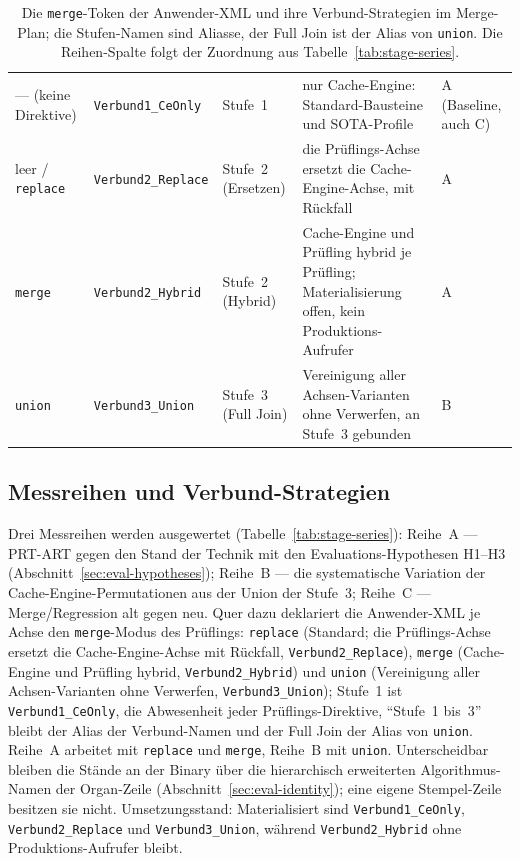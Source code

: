 \begin{nurlang}
\begin{table}[htbp]
\begin{tabular}{@{}ll>{\raggedright\arraybackslash}p{2.2cm}>{\raggedright\arraybackslash}p{4.4cm}>{\raggedright\arraybackslash}p{1.6cm}@{}}
\midrule
--- (keine Direktive) & \texttt{Verbund1\_CeOnly} & Stufe~1 & nur Cache-Engine: Standard-Bausteine und SOTA-Profile & A (Baseline, auch C) \\
leer / \texttt{replace} & \texttt{Verbund2\_Replace} & Stufe~2 (Ersetzen) & die Prüflings-Achse ersetzt die Cache-Engine-Achse, mit Rückfall & A \\
\texttt{merge} & \texttt{Verbund2\_Hybrid} & Stufe~2 (Hybrid) & Cache-Engine und Prüfling hybrid je Prüfling; Materialisierung offen, kein Produktions-Aufrufer & A \\
\texttt{union} & \texttt{Verbund3\_Union} & Stufe~3 (Full Join) & Vereinigung aller Achsen-Varianten ohne Verwerfen, an Stufe~3 gebunden & B \\
\bottomrule
\end{tabular}
\caption{Die \texttt{merge}-Token der Anwender-XML und ihre Verbund-Strategien im Merge-Plan; die
Stufen-Namen sind Aliasse, der Full Join ist der Alias von \texttt{union}. Die Reihen-Spalte folgt
der Zuordnung aus Tabelle~\ref{tab:stage-series}.}\label{tab:eval-verbund-modi}
\end{table}
\end{nurlang}
\begin{nurkurz}
\subsection{Messreihen und Verbund-Strategien}\label{sec:eval-series}
Drei Messreihen werden ausgewertet (Tabelle~\ref{tab:stage-series}): Reihe~A --- PRT-ART gegen den Stand
der Technik mit den Evaluations-Hypothesen H1--H3 (Abschnitt~\ref{sec:eval-hypotheses}); Reihe~B --- die
systematische Variation der Cache-Engine-Permutationen aus der Union der Stufe~3; Reihe~C ---
Merge/Regression alt gegen neu. Quer dazu deklariert die Anwender-XML je Achse den \texttt{merge}-Modus
des Prüflings: \texttt{replace} (Standard; die Prüflings-Achse ersetzt die Cache-Engine-Achse mit
Rückfall, \texttt{Verbund2\_Replace}), \texttt{merge} (Cache-Engine und Prüfling hybrid,
\texttt{Verbund2\_Hybrid}) und \texttt{union} (Vereinigung aller Achsen-Varianten ohne Verwerfen,
\texttt{Verbund3\_Union}); Stufe~1 ist \texttt{Verbund1\_CeOnly}, die
Abwesenheit jeder Prüflings-Direktive, \enquote{Stufe~1 bis~3} bleibt der Alias der Verbund-Namen und der
Full Join der Alias von \texttt{union}. Reihe~A arbeitet mit \texttt{replace} und \texttt{merge}, Reihe~B
mit \texttt{union}. Unterscheidbar bleiben die Stände an der Binary über die hierarchisch erweiterten
Algorithmus-Namen der Organ-Zeile (Abschnitt~\ref{sec:eval-identity}); eine eigene Stempel-Zeile besitzen
sie nicht. Umsetzungsstand: Materialisiert sind \texttt{Verbund1\_CeOnly}, \texttt{Verbund2\_Replace} und
\texttt{Verbund3\_Union}, während \texttt{Verbund2\_Hybrid} ohne Produktions-Aufrufer bleibt.
\end{nurkurz}

